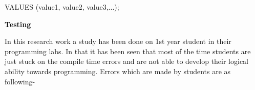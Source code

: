 \documentclass[12pt]{report}
\renewcommand{\_}{\kern-1.5pt\textunderscore\kern-1.5pt}
\begin{document}
\begin{adjustwidth}{0.3in}{0.84in}
\begin{justify}
\textcolor[HTML]{0D0D0D}{VALUES (value1, value2, value3,...);}
\end{justify}\par

\end{adjustwidth}




\newpage

\vspace{\baselineskip}
\vspace{\baselineskip}

\vspace{\baselineskip}

\vspace{\baselineskip}
\begin{adjustwidth}{0.3in}{0.84in}
\begin{FlushRight}
{\fontsize{24pt}{28.8pt}\selectfont \textbf{\textcolor[HTML]{0D0D0D}{Testing}}\par}
\end{FlushRight}\par

\end{adjustwidth}


\vspace{\baselineskip}

\vspace{\baselineskip}
\vspace{\baselineskip}

\vspace{\baselineskip}
\begin{adjustwidth}{0.3in}{0.84in}
{\fontsize{14pt}{16.8pt}\selectfont \textbf{\textcolor[HTML]{0D0D0D}{7.1\par} }}{\fontsize{14pt}{16.8pt}\selectfont \textbf{\textcolor[HTML]{0D0D0D}{Basic Terminology}}\par}\par

\end{adjustwidth}

\begin{adjustwidth}{0.3in}{0.84in}
\textcolor[HTML]{0D0D0D}{In this research work a study has been done on 1st year student in their programming labs. In that it has been seen that most of the time students are just stuck on the compile time errors and are not able to develop their logical ability towards programming. Errors which are made by students are as following-}\par

\end{adjustwidth}
\end{document}
